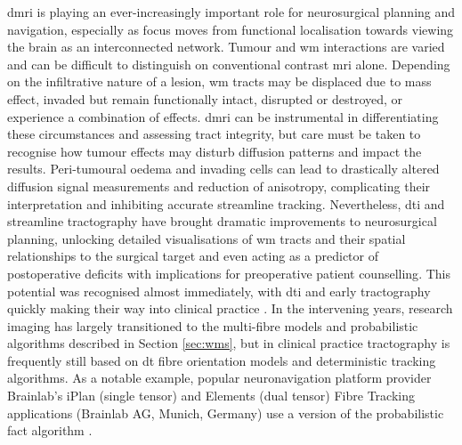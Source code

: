 \gls{dmri} is playing an ever-increasingly important role for neurosurgical planning and navigation\autocite{Manan2022}, especially as focus moves from functional localisation towards viewing the brain as an interconnected network.
Tumour and \gls{wm} interactions are varied and can be difficult to distinguish on conventional contrast \gls{mri} alone.
Depending on the infiltrative nature of a lesion, \gls{wm} tracts may be displaced due to mass effect, invaded but remain functionally intact, disrupted or destroyed, or experience a combination of effects\autocite{Essayed2017,DSouza2019,Manan2023}.
\gls{dmri} can be instrumental in differentiating these circumstances and assessing tract integrity\autocite{Field2004,Manan2023}, but care must be taken to recognise how tumour effects may disturb diffusion patterns and impact the results.
Peri-tumoural oedema and invading cells can lead to drastically altered diffusion signal measurements and reduction of anisotropy, complicating their interpretation and inhibiting accurate streamline tracking\autocite{Bulakbas2009,Nimsky2010,Kuhnt2013}.
Nevertheless, \gls{dti} and streamline tractography have brought dramatic improvements to neurosurgical planning, unlocking detailed visualisations of \gls{wm} tracts and their spatial relationships to the surgical target and even acting as a predictor of postoperative deficits with implications for preoperative patient counselling\autocite{Manan2022}.
This potential was recognised almost immediately, with \gls{dti} and early tractography quickly making their way into clinical practice \autocite{Lee2001,Mori2002a,Nimsky2005}.
In the intervening years, research imaging has largely transitioned to the multi-fibre models and probabilistic algorithms described in Section \ref{sec:wms}, but in clinical practice tractography is frequently still based on \gls{dt} fibre orientation models \autocite{Toescu2020, Yang2021} and deterministic tracking algorithms.
As a notable example, popular neuronavigation platform provider Brainlab's iPlan\textregistered{} (single tensor)\autocite{Brainlab2012} and Elements (dual tensor)\autocite{Sollmann2020a} Fibre Tracking applications (Brainlab AG, Munich, Germany) use a version of the probabilistic \gls{fact} algorithm \autocite{Mori1999}.

